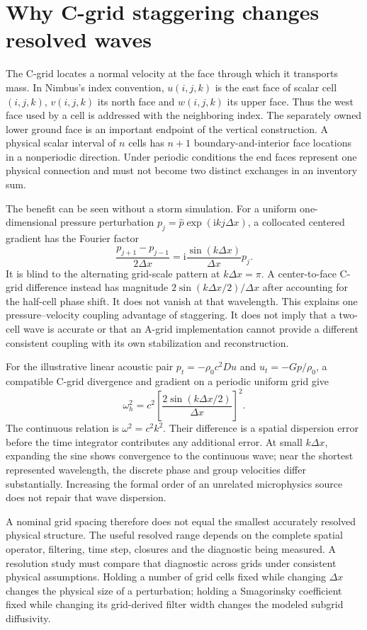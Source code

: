 \section{Why C-grid staggering changes resolved waves}

The C-grid locates a normal velocity at the face through which it transports
mass. In Nimbus's index convention, $u(i,j,k)$ is the east face of scalar cell
$(i,j,k)$, $v(i,j,k)$ its north face and $w(i,j,k)$ its upper face. Thus the west
face used by a cell is addressed with the neighboring index. The separately
owned lower ground face is an important endpoint of the vertical construction.
A physical scalar interval of $n$ cells has $n+1$ boundary-and-interior face
locations in a nonperiodic direction. Under periodic conditions the end faces
represent one physical connection and must not become two distinct exchanges
in an inventory sum.

The benefit can be seen without a storm simulation. For a uniform one-dimensional
pressure perturbation $p_j=\widehat p\exp(\mathrm{i}kj\Delta x)$, a collocated
centered gradient has the Fourier factor
\[
 \frac{p_{j+1}-p_{j-1}}{2\Delta x}
 =\mathrm{i}\frac{\sin(k\Delta x)}{\Delta x}p_j.
\]
It is blind to the alternating grid-scale pattern at $k\Delta x=\pi$. A
center-to-face C-grid difference instead has magnitude
$2\sin(k\Delta x/2)/\Delta x$ after accounting for the half-cell phase shift.
It does not vanish at that wavelength. This explains one pressure--velocity
coupling advantage of staggering. It does not imply that a two-cell wave is
accurate or that an A-grid implementation cannot provide a different consistent
coupling with its own stabilization and reconstruction.

For the illustrative linear acoustic pair
$p_t=-\rho_0c^2 D u$ and $u_t=-G p/\rho_0$, a compatible C-grid divergence
and gradient on a periodic uniform grid give
\[
 \omega_h^2=c^2\left[\frac{2\sin(k\Delta x/2)}{\Delta x}\right]^2.
\]
The continuous relation is $\omega^2=c^2k^2$. Their difference is a spatial
dispersion error before the time integrator contributes any additional error.
At small $k\Delta x$, expanding the sine shows convergence to the continuous
wave; near the shortest represented wavelength, the discrete phase and group
velocities differ substantially. Increasing the formal order of an unrelated
microphysics source does not repair that wave dispersion.

A nominal grid spacing therefore does not equal the smallest accurately
resolved physical structure. The useful resolved range depends on the complete
spatial operator, filtering, time step, closures and the diagnostic being
measured. A resolution study must compare that diagnostic across grids under
consistent physical assumptions. Holding a number of grid cells fixed while
changing $\Delta x$ changes the physical size of a perturbation; holding a
Smagorinsky coefficient fixed while changing its grid-derived filter width
changes the modeled subgrid diffusivity.

